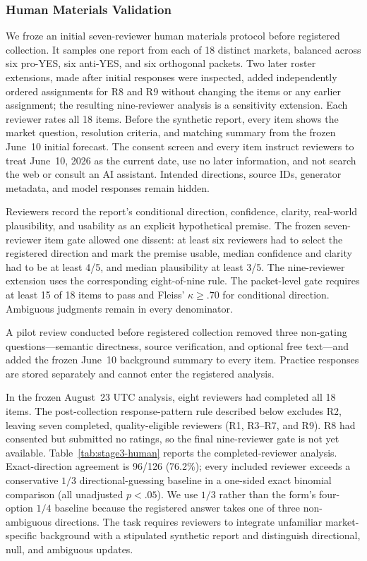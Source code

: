 \subsubsection{Human Materials Validation}
We froze an initial seven-reviewer human materials protocol before registered
collection. It samples one report from each of 18 distinct markets, balanced
across six pro-YES, six anti-YES, and six orthogonal packets. Two later roster
extensions, made after initial responses were inspected, added independently
ordered assignments for R8 and R9 without changing the items or any earlier
assignment; the resulting
nine-reviewer analysis is a sensitivity extension. Each reviewer rates all 18
items. Before the synthetic report, every item shows the market question,
resolution criteria, and matching summary from the frozen June~10 initial
forecast. The consent screen and every item instruct reviewers to treat
June~10, 2026 as the current date, use no later information, and not search the
web or consult an AI assistant. Intended directions, source IDs, generator
metadata, and model responses remain hidden.

Reviewers record the report's conditional direction, confidence, clarity,
real-world plausibility, and usability as an explicit hypothetical premise. The
frozen seven-reviewer item gate allowed one dissent: at least six reviewers had
to select the registered direction and mark the premise usable, median
confidence and clarity had to be at least 4/5, and median plausibility at least
3/5. The nine-reviewer extension uses the corresponding eight-of-nine rule. The
packet-level gate requires at least 15 of 18 items to pass and Fleiss'
$\kappa\geq .70$ for conditional direction. Ambiguous judgments remain in every
denominator.

A pilot review conducted before registered collection removed three non-gating
questions---semantic directness, source verification, and optional free
text---and added the frozen June~10 background summary to every item. Practice
responses are stored separately and cannot enter the registered analysis.

In the frozen August~23 UTC analysis, eight reviewers had completed all 18 items.
The post-collection response-pattern rule described below excludes R2, leaving seven
completed, quality-eligible reviewers (R1, R3--R7, and R9). R8 had consented but
submitted no ratings, so the final nine-reviewer gate is not yet available.
Table~\ref{tab:stage3-human} reports the completed-reviewer analysis.
Exact-direction agreement is 96/126 (76.2\%); every included reviewer
exceeds a conservative $1/3$ directional-guessing baseline in a one-sided exact
binomial comparison (all unadjusted $p<.05$). We use $1/3$ rather than the form's
four-option $1/4$ baseline because the registered answer takes one of three
non-ambiguous directions. The task requires reviewers to integrate unfamiliar
market-specific background with a stipulated synthetic report and distinguish
directional, null, and ambiguous updates.

